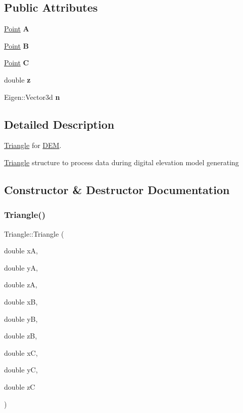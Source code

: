\subsection*{Public Attributes}
\begin{DoxyCompactItemize}
\item 
\mbox{\label{classTriangle_a66edc1a5890531ea7550643c4866be59}} 
\hyperlink{classPoint}{Point} {\bfseries A}
\item 
\mbox{\label{classTriangle_a0e89c26ad3612019a8d3489c70c7d0e3}} 
\hyperlink{classPoint}{Point} {\bfseries B}
\item 
\mbox{\label{classTriangle_ad5ef40fc843295b32ae0db058636d75e}} 
\hyperlink{classPoint}{Point} {\bfseries C}
\item 
\mbox{\label{classTriangle_a71c942f295b9fba50ab958ec29eeac7a}} 
double {\bfseries z}
\item 
\mbox{\label{classTriangle_aaabd9fca950e2bb4ea08d47c360b1c4a}} 
Eigen\+::\+Vector3d {\bfseries n}
\end{DoxyCompactItemize}


\subsection{Detailed Description}
\hyperlink{classTriangle}{Triangle} for \hyperlink{classDEM}{D\+EM}. 

\hyperlink{classTriangle}{Triangle} structure to process data during digital elevation model generating 

\subsection{Constructor \& Destructor Documentation}
\mbox{\label{classTriangle_a3b15c4bcca06890db57e3a50d55ae7bb}} 
\subsubsection{\texorpdfstring{Triangle()}{Triangle()}}
{\footnotesize\ttfamily Triangle\+::\+Triangle (\begin{DoxyParamCaption}\item[{double}]{xA,  }\item[{double}]{yA,  }\item[{double}]{zA,  }\item[{double}]{xB,  }\item[{double}]{yB,  }\item[{double}]{zB,  }\item[{double}]{xC,  }\item[{double}]{yC,  }\item[{double}]{zC }\end{DoxyParamCaption})}




